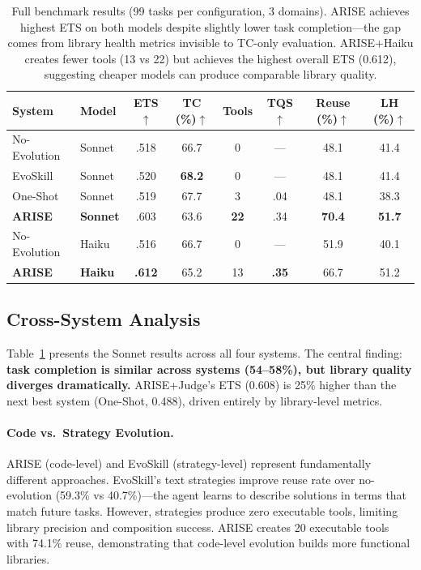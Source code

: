 \documentclass[10pt,twocolumn]{article}
\begin{document}
\begin{table}[t]
\centering
\footnotesize
\begin{tabular}{@{}llcccccc@{}}
\toprule
\textbf{System} & \textbf{Model} & \textbf{ETS}$\uparrow$ & \textbf{TC (\%)}$\uparrow$ & \textbf{Tools} & \textbf{TQS}$\uparrow$ & \textbf{Reuse (\%)}$\uparrow$ & \textbf{LH (\%)}$\uparrow$ \\
\midrule
No-Evolution & Sonnet & .518 & 66.7 & 0 & --- & 48.1 & 41.4 \\
EvoSkill & Sonnet & .520 & \textbf{68.2} & 0 & --- & 48.1 & 41.4 \\
One-Shot & Sonnet & .519 & 67.7 & 3 & .04 & 48.1 & 38.3 \\
\textbf{ARISE} & \textbf{Sonnet} & .603 & 63.6 & \textbf{22} & .34 & \textbf{70.4} & \textbf{51.7} \\
\midrule
No-Evolution & Haiku & .516 & 66.7 & 0 & --- & 51.9 & 40.1 \\
\textbf{ARISE} & \textbf{Haiku} & \textbf{.612} & 65.2 & 13 & \textbf{.35} & 66.7 & 51.2 \\
\bottomrule
\end{tabular}
\caption{Full benchmark results (99 tasks per configuration, 3 domains). ARISE achieves highest ETS on both models despite slightly lower task completion---the gap comes from library health metrics invisible to TC-only evaluation. ARISE+Haiku creates fewer tools (13 vs 22) but achieves the highest overall ETS (0.612), suggesting cheaper models can produce comparable library quality.}
\label{tab:results_full}
\end{table}

\subsection{Cross-System Analysis}

Table~\ref{tab:results_full} presents the Sonnet results across all four systems. The central finding: \textbf{task completion is similar across systems (54--58\%), but library quality diverges dramatically.} ARISE+Judge's ETS (0.608) is 25\% higher than the next best system (One-Shot, 0.488), driven entirely by library-level metrics.

\paragraph{Code vs.\ Strategy Evolution.} ARISE (code-level) and EvoSkill (strategy-level) represent fundamentally different approaches. EvoSkill's text strategies improve reuse rate over no-evolution (59.3\% vs 40.7\%)---the agent learns to describe solutions in terms that match future tasks. However, strategies produce zero executable tools, limiting library precision and composition success. ARISE creates 20 executable tools with 74.1\% reuse, demonstrating that code-level evolution builds more functional libraries.
\end{document}
